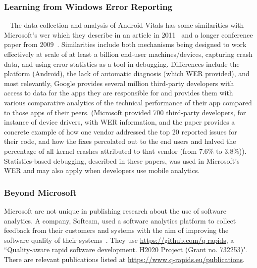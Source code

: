 \subsubsection{Learning from Windows Error Reporting}~\label{rw-learning-from-wer}
The data collection and analysis of Android Vitals has some similarities with Microsoft's \acrfull{wer} which they describe in an article in 2011~\cite{kinshuman2011_debugging_in_the_very_large} and a longer conference paper from 2009~\cite{kinshuman2009_debugging_in_the_very_large}. Similarities include both mechanisms being designed to work effectively at scale of at least a billion end-user machines/devices, capturing crash data, and using error statistics as a tool in debugging. Differences include the platform (Android), the lack of automatic diagnosis (which WER provided), and most relevantly, Google provides several million third-party developers with access to data for the apps they are responsible for and provides them with various comparative analytics of the technical performance of their app compared to those apps of their peers. (Microsoft provided 700 third-party developers, for instance of device drivers, with WER information, and the paper provides a concrete example of how one vendor addressed the top 20 reported issues for their code, and how the fixes percolated out to the end users and halved the percentage of all kernel crashes attributed to that vendor (from 7.6\% to 3.8\%)). Statistics-based debugging, described in these papers, was used in Microsoft's WER and may also apply when developers use mobile analytics.

\subsubsection{Beyond Microsoft}
Microsoft are not unique in publishing research about the use of software analytics. A company, Softeam, used a software analytics platform to collect feedback from their customers and systems with the aim of improving the software quality of their systems~\cite{bagnato2020_challenges_and_benefits_from_using_software_analytics_in_softeam}. They use \url{https://github.com/q-rapids}, a ``Quality-aware rapid software development. H2020 Project (Grant no. 732253)". There are relevant publications listed at \url{https://www.q-rapids.eu/publications}.

